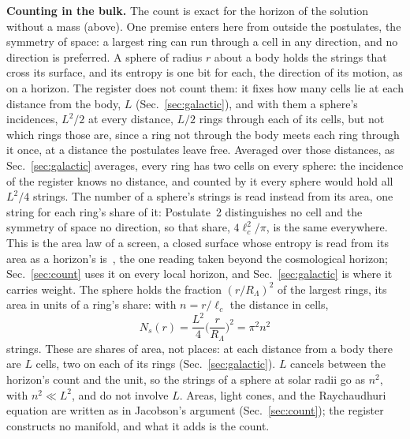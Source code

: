 \documentclass[aps,prd,twocolumn,superscriptaddress,nofootinbib,showkeys]{revtex4-2}
\newcommand{\lc}{\ell_c}
\newcommand{\RL}{R_\Lambda}
\begin{document}
\textbf{Counting in the bulk.} The count is exact for the horizon of the solution without a mass (above). One premise enters here from outside the postulates, the symmetry of space: a largest ring can run through a cell in any direction, and no direction is preferred. A sphere of radius $r$ about a body holds the strings that cross its surface, and its entropy is one bit for each, the direction of its motion, as on a horizon. The register does not count them: it fixes how many cells lie at each distance from the body, $L$ (Sec.~\ref{sec:galactic}), and with them a sphere's incidences, $L^2/2$ at every distance, $L/2$ rings through each of its cells, but not which rings those are, since a ring not through the body meets each ring through it once, at a distance the postulates leave free. Averaged over those distances, as Sec.~\ref{sec:galactic} averages, every ring has two cells on every sphere: the incidence of the register knows no distance, and counted by it every sphere would hold all $L^2/4$ strings. The number of a sphere's strings is read instead from its area, one string for each ring's share of it: Postulate~2 distinguishes no cell and the symmetry of space no direction, so that share, $4\lc^2/\pi$, is the same everywhere. This is the area law of a screen, a closed surface whose entropy is read from its area as a horizon's is~\cite{verlinde2011,padmanabhan2010}, the one reading taken beyond the cosmological horizon; Sec.~\ref{sec:count} uses it on every local horizon, and Sec.~\ref{sec:galactic} is where it carries weight. The sphere holds the fraction $(r/\RL)^2$ of the largest rings, its area in units of a ring's share: with $n = r/\lc$ the distance in cells,
\begin{equation}
N_s(r) = \frac{L^2}{4}\Big(\frac{r}{\RL}\Big)^2 = \pi^2 n^2
\label{eq:N}
\end{equation}
strings. These are shares of area, not places: at each distance from a body there are $L$ cells, two on each of its rings (Sec.~\ref{sec:galactic}). $L$ cancels between the horizon's count and the unit, so the strings of a sphere at solar radii go as $n^2$, with $n^2\ll L^2$, and do not involve $L$. Areas, light cones, and the Raychaudhuri equation are written as in Jacobson's argument (Sec.~\ref{sec:count}); the register constructs no manifold, and what it adds is the count.
\end{document}
